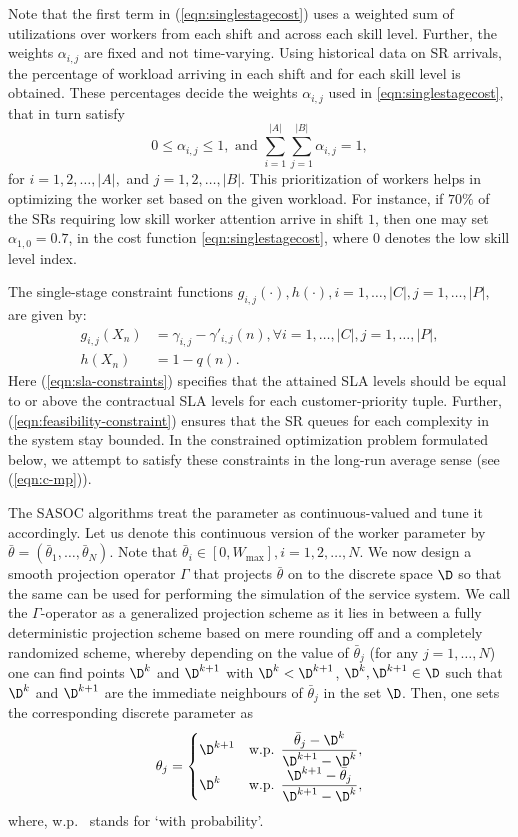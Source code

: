 \documentclass[11pt,letterpaper,english]{article}
\begin{document}
Note that the first term in (\ref{eqn:singlestagecost}) uses a weighted sum of utilizations over workers from each shift and across each skill level.  Further, the weights $\alpha_{i,j}$ are fixed and not time-varying. Using historical data on SR arrivals, the percentage of workload arriving in each shift and for each skill level is obtained. These percentages decide the weights $\alpha_{i,j}$ used in \eqref{eqn:singlestagecost}, that in turn satisfy
\[0 \le \alpha_{i,j} \le 1, \textrm{ and }\sum_{i=1}^{|A|}\sum_{j=1}^{|B|} \alpha_{i,j} = 1,\]
for $i=1,2,\ldots,|A|,$ and $j=1,2,\ldots,|B|$. This prioritization of workers helps in optimizing the worker set based on the given workload. For instance, if $70\%$ of the SRs requiring low skill worker attention arrive in shift $1$, then one may set $\alpha_{1,0} = 0.7$, in the cost function \eqref{eqn:singlestagecost}, where $0$ denotes the low skill level index.

The single-stage constraint functions $g_{i,j}(\cdot), h(\cdot), i = 1, \dots, |C|, j = 1, \dots, |P|,$ are given by:
\begin{align}
g_{i,j}(X_n) & = \gamma_{i,j} - \gamma'_{i,j}(n), \forall i=1,\ldots,|C|, j=1,\ldots,|P|,\label{eqn:sla-constraints}\\[1ex]
h(X_n) & = 1 - q(n).\label{eqn:feasibility-constraint}
\end{align}
Here (\ref{eqn:sla-constraints}) specifies that the attained SLA levels should be equal to or above the contractual SLA levels for each customer-priority tuple. Further, (\ref{eqn:feasibility-constraint}) ensures that the SR queues for each complexity in the system stay bounded. In the constrained optimization problem formulated below, we attempt to satisfy these constraints in the long-run average sense (see (\ref{eqn:c-mp})).

The SASOC algorithms treat the parameter as continuous-valued and tune it accordingly. Let us denote this continuous version of the worker parameter by $\bar\theta = (\bar\theta_1,\ldots,\bar\theta_N)$. Note that $\bar\theta_i \in [0, W_{\max}], i=1,2,\ldots,N$. We now design a smooth projection operator $\Gamma$ that projects $\bar\theta$ on to the discrete space $\D$ so that the same can be used for performing the simulation of the service system. We call the $\Gamma$-operator as a generalized projection scheme as it lies in between a fully deterministic projection scheme based on mere rounding off and a completely randomized scheme, whereby depending on the value of $\bar\theta_j$ (for any $j=1,\ldots,N$) one can find points $\D^k$ and $\D^{k+1}$ with $\D^k < \D^{k + 1}$, $\D^k, \D^{k + 1} \in \D$ such that $\D^k$ and $\D^{k + 1}$ are the immediate neighbours of $\bar\theta_j$ in the set $\D$. Then, one sets the corresponding discrete parameter as
\begin{equation}
 \theta_j =
  \begin{cases}
   \D^{k + 1} &  \text{w.p. } \dfrac{\bar\theta_j - \D^k }{\D^{k + 1} - \D^k}, \\
   \D^k &  \text{w.p. } \dfrac{\D^{k + 1} - \bar\theta_j }{\D^{k + 1} - \D^k},
  \end{cases}
\end{equation}
where, w.p.~ stands for `with probability'.
\end{document}
